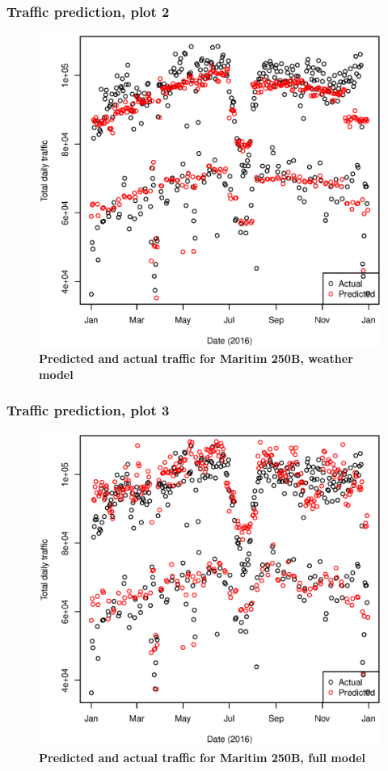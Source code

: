 \documentclass{beamer}
\begin{document}
\begin{frame}\frametitle{Traffic prediction, plot 2}
\begin{figure}
  \centering
   \includegraphics[scale=0.35]{plots/predict_maritim_withweather.eps}
    \caption{\textbf{Predicted and actual traffic for Maritim 250B, \hspace{\textwidth}weather model}}
\end{figure}
\end{frame}

\begin{frame}\frametitle{Traffic prediction, plot 3}
\begin{figure}
  \centering
   \includegraphics[scale=0.35]{plots/predict_maritim_everything.eps}
    \caption{\textbf{Predicted and actual traffic for Maritim 250B, \hspace{\textwidth}full model}}
\end{figure}
\end{frame}
\end{document}
